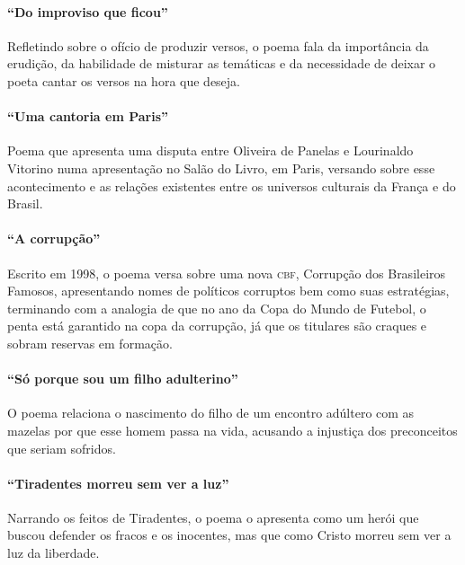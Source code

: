 \paragraph{``Do improviso que ficou''}

Refletindo sobre o ofício de produzir versos, o poema fala da
importância da erudição, da habilidade de misturar as temáticas e da
necessidade de deixar o poeta cantar os versos na hora que deseja.

\paragraph{``Uma cantoria em Paris''}

Poema que apresenta uma disputa entre Oliveira de Panelas e Lourinaldo Vitorino numa
apresentação no Salão do Livro, em Paris, versando sobre esse
acontecimento e as relações existentes entre os universos culturais da
França e do Brasil.

\paragraph{``A corrupção''}

Escrito em 1998, o poema versa sobre uma nova \textsc{cbf}, Corrupção dos
Brasileiros Famosos, apresentando nomes de políticos corruptos bem como
suas estratégias, terminando com a analogia de que no ano da Copa do
Mundo de Futebol, o penta está garantido na copa da corrupção, já que
os titulares são craques e sobram reservas em formação.

\paragraph{``Só porque sou um filho adulterino''}

O poema relaciona o nascimento do filho de um encontro adúltero com as
mazelas por que esse homem passa na vida, acusando a injustiça dos preconceitos
que seriam sofridos.

\paragraph{``Tiradentes morreu sem ver a luz''}

Narrando os feitos de Tiradentes, o poema o apresenta como um herói que
buscou defender os fracos e os inocentes, mas que como Cristo morreu
sem ver a luz da liberdade.

